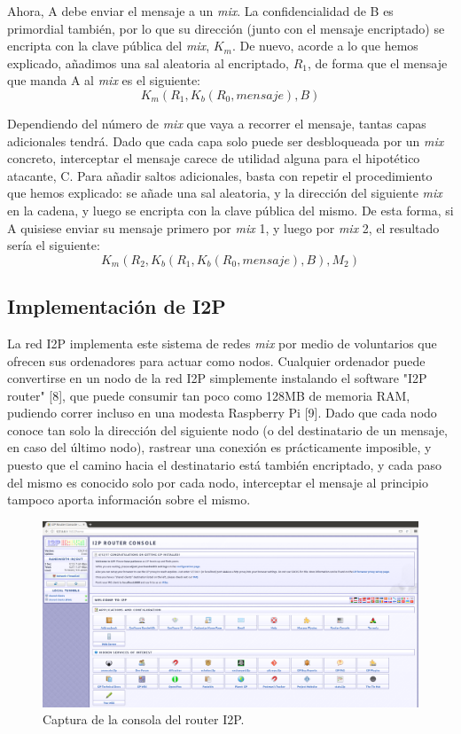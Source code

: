 \documentclass[12]{article}
\begin{document}
Ahora, A debe enviar el mensaje a un \textit{mix}. La confidencialidad de B es primordial también, por lo que su dirección (junto con el mensaje encriptado) se encripta con la clave pública del \textit{mix},
\(K_m\). De nuevo, acorde a lo que hemos explicado, añadimos una sal aleatoria al encriptado, \(R_1\), de forma que el mensaje que manda A al \textit{mix} es el siguiente: \[K_m(R_1, K_b(R_0, mensaje), B)\]

Dependiendo del número de \textit{mix} que vaya a recorrer el mensaje, tantas capas adicionales tendrá. Dado que cada capa solo puede ser desbloqueada por un \textit{mix} concreto, interceptar
el mensaje carece de utilidad alguna para el hipotético atacante, C. Para añadir saltos adicionales, basta con repetir el procedimiento que hemos explicado: se añade una sal aleatoria, y la dirección
del siguiente \textit{mix} en la cadena, y luego se encripta con la clave pública del mismo. De esta forma, si A quisiese enviar su mensaje primero por \textit{mix} 1, y luego por \textit{mix} 2,
el resultado sería el siguiente: \[K_m(R_2, K_b(R_1, K_b(R_0, mensaje), B), M_2)\]

\subsection{Implementación de I2P}

La red I2P implementa este sistema de redes \textit{mix} por medio de voluntarios que ofrecen sus ordenadores para actuar como nodos. Cualquier ordenador puede convertirse en un nodo de la red
I2P simplemente instalando el software "I2P router" [8], que puede consumir tan poco como 128MB de memoria RAM, pudiendo correr incluso en una modesta Raspberry Pi [9].
Dado que cada nodo conoce tan solo la dirección del siguiente nodo (o del destinatario de un mensaje, en caso del último nodo), rastrear una conexión es prácticamente imposible, y puesto que el camino
hacia el destinatario está también encriptado, y cada paso del mismo es conocido solo por cada nodo, interceptar el mensaje al principio tampoco aporta información sobre el mismo.

\begin{figure}[H]
    \centering
    \includegraphics[width=\linewidth]{media/I2P Router Console.png}
    \caption{Captura de la consola del router I2P.}
    \label{fig2}
\end{figure}
\end{document}
